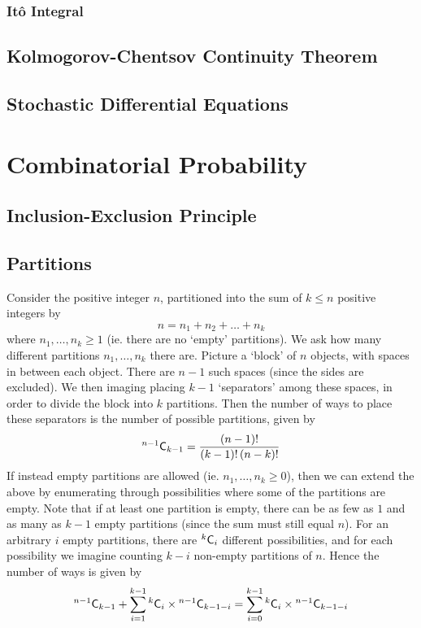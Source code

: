 \documentclass[11pt]{report} %
\begin{document}
\subsection{It\^{o} Integral}

\section{Kolmogorov-Chentsov Continuity Theorem}

\section{Stochastic Differential Equations}

\chapter{Combinatorial Probability}

\section{Inclusion-Exclusion Principle}

\section{Partitions}

Consider the positive integer $n$, partitioned into the sum of $k \leq n$ positive integers by
\begin{equation}
n = n_{1} + n_{2} + \dots + n_{k}
\end{equation}
where $n_{1}, \dots, n_{k} \geq 1$ (ie. there are no `empty' partitions). We ask how many different partitions $n_{1}, \dots, n_{k}$ there are. Picture a `block' of $n$ objects, with spaces in between each object. There are $n - 1$ such spaces (since the sides are excluded). We then imaging placing $k - 1$ `separators' among these spaces, in order to divide the block into $k$ partitions. Then the number of ways to place these separators is the number of possible partitions, given by
\begin{equation}
\mathstrut^{n-1}\mathsf{C}_{k - 1} = \dfrac{\left(n - 1\right)!}{\left(k - 1\right)!\left(n - k\right)!}
\end{equation}
If instead empty partitions are allowed (ie. $n_{1}, \dots, n_{k} \geq 0$), then we can extend the above by enumerating through possibilities where some of the partitions are empty. Note that if at least one partition is empty, there can be as few as $1$ and as many as $k - 1$ empty partitions (since the sum must still equal $n$). For an arbitrary $i$ empty partitions, there are $\mathstrut^{k}\mathsf{C}_{i}$ different possibilities, and for each possibility we imagine counting $k - i$ non-empty partitions of $n$. Hence the number of ways is given by
\begin{equation}
\mathstrut^{n-1}\mathsf{C}_{k - 1} + \sum_{i = 1}^{k - 1}\mathstrut^{k}\mathsf{C}_{i}\times\mathstrut^{n-1}\mathsf{C}_{k - 1 - i} = \sum_{i = 0}^{k - 1}\mathstrut^{k}\mathsf{C}_{i}\times\mathstrut^{n-1}\mathsf{C}_{k - 1 - i}
\end{equation}
\end{document}
